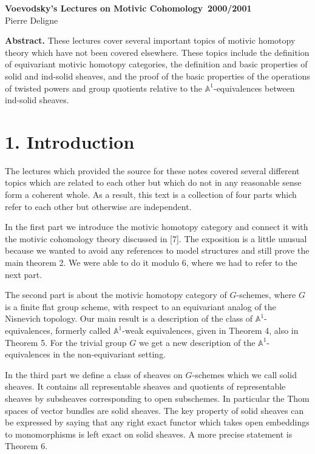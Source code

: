 \documentclass[11pt]{article}
\newcommand{\Aone}{\mathbb A^1}
\theoremstyle{deligne}
\begin{document}
\begin{center}
{\Large\bfseries Voevodsky's Lectures on Motivic Cohomology\ 2000/2001}\\[0.6em]
{\large Pierre Deligne}
\end{center}

\textbf{Abstract.} These lectures cover several important topics of motivic homotopy theory which have not been covered elsewhere. These topics include the definition of equivariant motivic homotopy categories, the definition and basic properties of solid and ind-solid sheaves, and the proof of the basic properties of the operations of twisted powers and group quotients relative to the \(\Aone\)-equivalences between ind-solid sheaves.

\section*{1. Introduction}

The lectures which provided the source for these notes covered several different topics which are related to each other but which do not in any reasonable sense form a coherent whole. As a result, this text is a collection of four parts which refer to each other but otherwise are independent.

In the first part we introduce the motivic homotopy category and connect it with the motivic cohomology theory discussed in [7]. The exposition is a little unusual because we wanted to avoid any references to model structures and still prove the main theorem 2. We were able to do it modulo 6, where we had to refer to the next part.

The second part is about the motivic homotopy category of \(G\)-schemes, where \(G\) is a finite flat group scheme, with respect to an equivariant analog of the Nisnevich topology. Our main result is a description of the class of \(\Aone\)-equivalences, formerly called \(\Aone\)-weak equivalences, given in Theorem 4, also in Theorem 5. For the trivial group \(G\) we get a new description of the \(\Aone\)-equivalences in the non-equivariant setting.

In the third part we define a class of sheaves on \(G\)-schemes which we call solid sheaves. It contains all representable sheaves and quotients of representable sheaves by subsheaves corresponding to open subschemes. In particular the Thom spaces of vector bundles are solid sheaves. The key property of solid sheaves can be expressed by saying that any right exact functor which takes open embeddings to monomorphisms is left exact on solid sheaves. A more precise statement is Theorem 6.
\end{document}

